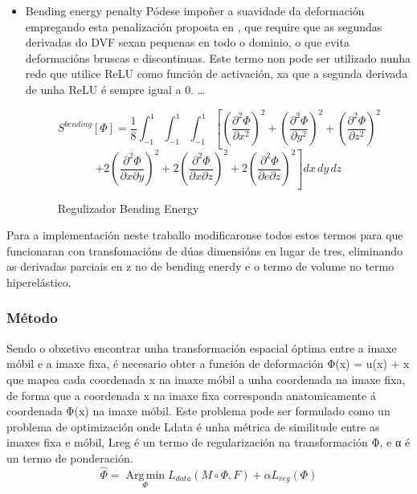 \begin{itemize}
    \item Bending energy penalty
    Pódese impoñer a suavidade da deformación empregando esta penalización proposta en \cite{bendingenergy}, que 
    require que as segundas derivadas do DVF sexan pequenas en todo o dominio, o que evita deformacións bruscas e discontinuas.
    Este termo non pode ser utilizado nunha rede que utilice ReLU como función de activación, xa que a segunda derivada de unha ReLU é sempre igual a 0.
    \dots
    
    \begin{figure}[ht!]
        \centering
        \[
        S^{bending}[\Phi] = \frac{1}{8} \int_{-1}^{1} \int_{-1}^{1} \int_{-1}^{1} \left[ \left( \frac{\partial^2 \Phi}{\partial x^2} \right)^2 + \left( \frac{\partial^2 \Phi}{\partial y^2} \right)^2 + \left( \frac{\partial^2 \Phi}{\partial z^2} \right)^2 \right.
        \]
        \[
        \left. + 2 \left( \frac{\partial^2 \Phi}{\partial x \partial y} \right)^2 + 2 \left( \frac{\partial^2 \Phi}{\partial x \partial z} \right)^2 + 2 \left( \frac{\partial^2 \Phi}{\partial e \partial z} \right)^2 \right] dx\,dy\,dz
        \]
        \caption{Regulizador Bending Energy}
    \end{figure}
    
\end{itemize}

Para a implementación neste traballo modificaronse todos estos termos para que funcionaran con transfomacións de dúas dimensións en lugar de tres,
 eliminando as derivadas parciais en z no de bending enerdy e o termo de volume no termo hiperelástico.

\subsubsection{Método}
\label{subsubsec:Método}

Sendo o obxetivo encontrar unha transformación espacial óptima entre a imaxe móbil e a imaxe fixa,
é necesario obter a función de deformación  Φ(x) = u(x) + x que mapea cada coordenada x na imaxe móbil a unha coordenada na imaxe fixa, 
de forma que a coordenada x na imaxe fixa corresponda anatomicamente á coordenada Φ(x) na imaxe móbil.
Este problema pode ser formulado como un problema de optimización onde Ldata é unha métrica de similitude entre as imaxes fixa e móbil, Lreg é un termo de regularización na transformación Φ, e α é un termo de ponderación.
\begin{equation}
   \hat{\Phi} = \operatorname*{Arg\,min}_{\Phi} L_{data}(M \circ \Phi, F) + \alpha L_{reg}(\Phi)
\end{equation}

